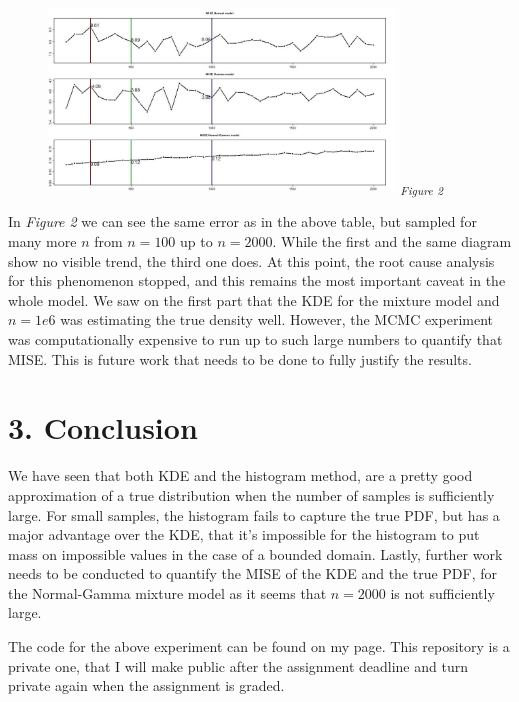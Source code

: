 \documentclass[fleqn, a4paper]{report}
\begin{document}
\begin{figure}[!h]
\includegraphics[width=0.82\textwidth]{./images/MISE error.jpg}
\textsubscript{\textit{Figure 2}}
\label{tab:fig_2}
\end{figure}

In \textit{Figure 2} we can see the same error as in the above table, but sampled for many more $n$ from $n=100$ up to $n=2000$. While the first and the same diagram show no visible trend, the third one does. At this point, the root cause analysis for this phenomenon stopped, and this remains the most important caveat in the whole model. We saw on the first part that the KDE for the mixture model and $n=1e6$ was estimating the true density well. However, the MCMC experiment was computationally expensive to run up to such large numbers to quantify that MISE. This is future work that needs to be done to fully justify the results. 

\section*{3. Conclusion}
We have seen that both KDE and the histogram method, are a pretty good approximation of a true distribution when the number of samples is sufficiently large. For small samples, the histogram fails to capture the true PDF, but has a major advantage over the KDE, that it's impossible for the histogram to put mass on impossible values in the case of a bounded domain. Lastly, further work needs to be conducted to quantify the MISE of the KDE and the true PDF, for the Normal-Gamma mixture model as it seems that $n=2000$ is not sufficiently large.

The code for the above experiment can be found on my \href{https://github.com/TedOiler/SRS/tree/master/Assignment_2}{\faGithub} page. This repository is a private one, that I will make public after the assignment deadline and turn private again when the assignment is graded.



\end{document}
